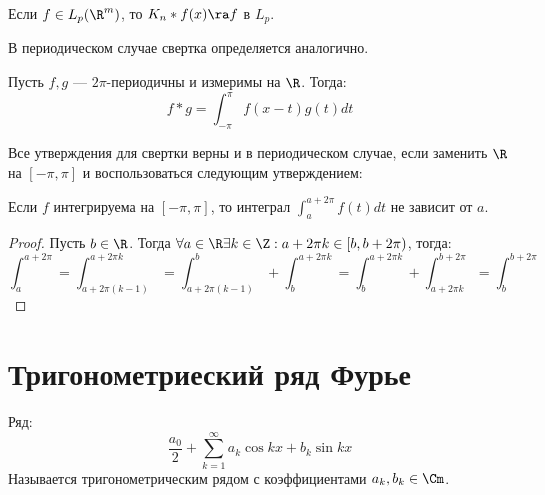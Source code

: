 \begin{problem}
    Если \(f \in L_p(\R^m)\), то \(K_n * f(x) \ra f\) в \(L_p\).
\end{problem}

В периодическом случае свертка определяется аналогично.
\begin{definition}
    Пусть \(f, g\) --- \(2\pi\)-периодичны и измеримы на \(\R\). Тогда:
    \[f * g = \int_{-\pi}^{\pi}f(x - t)g(t)dt\]
\end{definition}

\begin{note}
    Все утверждения для свертки верны и в периодическом случае, если заменить \(\R\) на \([-\pi, \pi]\) и воспользоваться следующим утверждением:
\end{note}

\begin{proposition}
    Если \(f\) интегрируема на \([-\pi, \pi]\), то интеграл \(\int_a^{a + 2\pi} f(t)dt\) не зависит от \(a\).
\end{proposition}
\begin{proof}
    Пусть \(b \in \R\). Тогда \(\forall a \in \R \exists k \in \Z: a + 2\pi k \in [b, b + 2\pi)\), тогда:
    \[\int_a^{a + 2\pi} = \int_{a + 2\pi(k - 1)}^{a + 2\pi k} = \int_{a + 2\pi(k - 1)}^{b} + \int_{b}^{a + 2\pi k} = \int_{b}^{a + 2\pi k} + \int_{a + 2\pi k}^{b + 2\pi} = \int_b^{b + 2 \pi}\]
\end{proof}



\section{Тригонометриеский ряд Фурье}
\begin{definition}
    Ряд:
    \begin{equation}
        \frac{a_0}{2} + \sum_{k = 1}^\infty a_k\cos kx + b_k\sin kx
    \end{equation}
    Называется тригонометрическим рядом с коэффициентами \(a_k, b_k \in \Cm\).
\end{definition}

